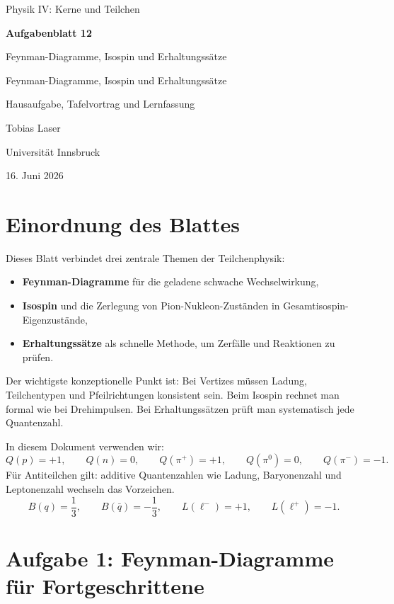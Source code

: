 \documentclass[11pt,a4paper]{scrartcl}
\newcommand{\CourseTitle}{COURSE NAME}
\newcommand{\DocumentKind}{DOCUMENT KIND}
\newcommand{\DocumentTitle}{DOCUMENT TITLE}
\newcommand{\DocumentSubtitle}{}
\newcommand{\AuthorName}{YOUR NAME}
\newcommand{\InstitutionName}{INSTITUTION NAME}
\newcommand{\SubmissionDate}{\today}
\newcommand{\makeuniversitytitle}{%
    \begin{titlepage}
        \centering
        \vspace*{2cm}
        {\Large \CourseTitle\par}
        \vspace{1.2cm}
        {\huge\bfseries \DocumentTitle\par}
        \ifx\DocumentSubtitle\empty\else
            \vspace{0.4cm}
            {\Large \DocumentSubtitle\par}
        \fi
        \vspace{1cm}
        {\Large \DocumentKind\par}
        \vfill
        {\large \AuthorName\par}
        \vspace{0.2cm}
        {\large \InstitutionName\par}
        \vspace{0.8cm}
        {\large \SubmissionDate\par}
    \end{titlepage}
    \pagenumbering{arabic}
}
\renewcommand{\CourseTitle}{Physik IV: Kerne und Teilchen}
\renewcommand{\DocumentKind}{Hausaufgabe, Tafelvortrag und Lernfassung}
\renewcommand{\DocumentTitle}{Aufgabenblatt 12}
\renewcommand{\DocumentSubtitle}{Feynman-Diagramme, Isospin und Erhaltungss\"atze}
\renewcommand{\AuthorName}{Tobias Laser}
\renewcommand{\InstitutionName}{Universit\"at Innsbruck}
\renewcommand{\SubmissionDate}{16. Juni 2026}
\newcommand{\pionp}{\pi^+}
\newcommand{\pionm}{\pi^-}
\newcommand{\pionz}{\pi^0}
\theoremstyle{definition}
\theoremstyle{plain}
\theoremstyle{remark}
\begin{document}
\makeuniversitytitle
\tableofcontents
\newpage

\section*{Einordnung des Blattes}

\begin{summarybox}[title=Ziel dieses Blattes]
Dieses Blatt verbindet drei zentrale Themen der Teilchenphysik:
\begin{itemize}
    \item \textbf{Feynman-Diagramme} für die geladene schwache Wechselwirkung,
    \item \textbf{Isospin} und die Zerlegung von Pion-Nukleon-Zuständen in Gesamtisospin-Eigenzustände,
    \item \textbf{Erhaltungssätze} als schnelle Methode, um Zerfälle und Reaktionen zu prüfen.
\end{itemize}
Der wichtigste konzeptionelle Punkt ist: Bei Vertizes müssen Ladung, Teilchentypen und Pfeilrichtungen konsistent sein. Beim Isospin rechnet man formal wie bei Drehimpulsen. Bei Erhaltungssätzen prüft man systematisch jede Quantenzahl.
\end{summarybox}

\begin{notebox}[title=Konventionen]
In diesem Dokument verwenden wir:
\[
    Q(p)=+1,\qquad Q(n)=0,\qquad Q(\pionp)=+1,\qquad Q(\pionz)=0,\qquad Q(\pionm)=-1.
\]
Für Antiteilchen gilt: additive Quantenzahlen wie Ladung, Baryonenzahl und Leptonenzahl wechseln das Vorzeichen.
\[
    B(q)=\frac{1}{3},\qquad B(\bar q)=-\frac{1}{3},
    \qquad
    L(\ell^-)=+1,\qquad L(\ell^+)=-1.
\]
\end{notebox}

\FloatBarrier
\newpage

\section{Aufgabe 1: Feynman-Diagramme f\"ur Fortgeschrittene}
\end{document}
